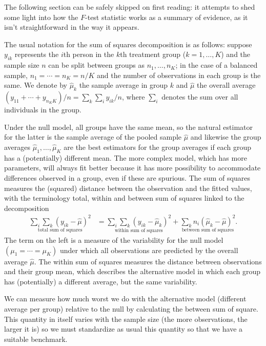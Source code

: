 \documentclass[
  11pt,
  letterpaper,
]{scrbook}
\theoremstyle{definition}
\theoremstyle{remark}
\begin{document}
The following section can be safely skipped on first reading: it
attempts to shed some light into how the \(F\)-test statistic works as a
summary of evidence, as it isn't straightforward in the way it appears.

The usual notation for the sum of squares decomposition is as follows:
suppose \(y_{ik}\) represents the \(i\)th person in the \(k\)th
treatment group (\(k=1, \ldots, K\)) and the sample size \(n\) can be
split between groups as \(n_1, \ldots, n_K\); in the case of a balanced
sample, \(n_1=\cdots=n_K = n/K\) and the number of observations in each
group is the same. We denote by \(\widehat{\mu}_k\) the sample average
in group \(k\) and \(\widehat{\mu}\) the overall average
\((y_{11} + \cdots + y_{n_KK})/n = \sum_k \sum_i y_{ik}/n\), where
\(\sum_i\) denotes the sum over all individuals in the group.

Under the null model, all groups have the same mean, so the natural
estimator for the latter is the sample average of the pooled sample
\(\widehat{\mu}\) and likewise the group averages
\(\widehat{\mu}_1, \ldots, \widehat{\mu}_K\) are the best estimators for
the group averages if each group has a (potentially) different mean. The
more complex model, which has more parameters, will always fit better
because it has more possibility to accommodate differences observed in a
group, even if these are spurious. The sum of squares measures the
(squared) distance between the observation and the fitted values, with
the terminology total, within and between sum of squares linked to the
decomposition \begin{align*}
\underset{\text{total sum of squares} }{\sum_{i}\sum_{k} (y_{ik} - \widehat{\mu})^2} &= \underset{\text{within sum of squares} }{\sum_i \sum_k (y_{ik} - \widehat{\mu}_k)^2} +  \underset{\text{between sum of squares} }{\sum_k n_i (\widehat{\mu}_k - \widehat{\mu})^2}.
\end{align*} The term on the left is a measure of the variability for
the null model \((\mu_1 = \cdots = \mu_K)\) under which all observations
are predicted by the overall average \(\widehat{\mu}\). The within sum
of squares measures the distance between observations and their group
mean, which describes the alternative model in which each group has
(potentially) a different average, but the same variability.

We can measure how much worst we do with the alternative model
(different average per group) relative to the null by calculating the
between sum of square. This quantity in itself varies with the sample
size (the more observations, the larger it is) so we must standardize as
usual this quantity so that we have a suitable benchmark.
\end{document}
